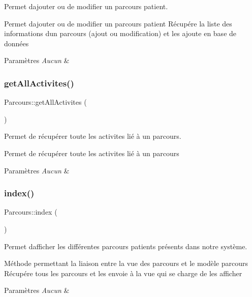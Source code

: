 Permet d\textquotesingle{}ajouter ou de modifier un parcours patient. 

Permet d\textquotesingle{}ajouter ou de modifier un parcours patient Récupére la liste des informations d\textquotesingle{}un parcours (ajout ou modification) et les ajoute en base de données 
\begin{DoxyParams}{Paramètres}
{\em Aucun} & \\
\hline
\end{DoxyParams}
\mbox{\label{class_parcours_ab4aef9c3a8aed0c0dae3414bee68b48d}} 
\subsubsection{\texorpdfstring{get\+All\+Activites()}{getAllActivites()}}
{\footnotesize\ttfamily Parcours\+::get\+All\+Activites (\begin{DoxyParamCaption}{ }\end{DoxyParamCaption})}



Permet de récupérer toute les activites lié à un parcours. 

Permet de récupérer toute les activites lié à un parcours 
\begin{DoxyParams}{Paramètres}
{\em Aucun} & \\
\hline
\end{DoxyParams}
\mbox{\label{class_parcours_ae1473c8bcf0e0aaa4e9424aaf03d267f}} 
\subsubsection{\texorpdfstring{index()}{index()}}
{\footnotesize\ttfamily Parcours\+::index (\begin{DoxyParamCaption}{ }\end{DoxyParamCaption})}



Permet d\textquotesingle{}afficher les différentes parcours patients présents dans notre système. 

Méthode permettant la liaison entre la vue des parcours et le modèle parcours Récupére tous les parcours et les envoie à la vue qui se charge de les afficher 
\begin{DoxyParams}{Paramètres}
{\em Aucun} & \\
\hline
\end{DoxyParams}
\mbox{\label{class_parcours_aeb3dde633ec9f36be95da75fedf067f3}} 
